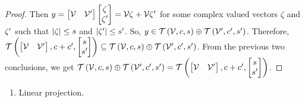 \begin{proof}
Then $y=\begin{bmatrix}\mathcal{V}
&\mathcal{V}^\prime\end{bmatrix}\begin{bmatrix}\zeta\\ \zeta^\prime\end{bmatrix}=\mathcal{V}\zeta+\mathcal{V}\zeta^\prime$
for some complex valued vectors $\zeta$ and $\zeta^\prime$ such that $\left|\zeta\right|\leq s$ and
$\left|\zeta^\prime\right|\leq s^\prime$.  So,
$y\in\mathit{\mathcal{T}}\left(\mathcal{V},c,s\right)\oplus \mathit{\mathcal{T}}\left(\mathcal{V}^\prime,c^\prime,s^\prime\right)$.
Therefore, $\mathit{\mathcal{T}}\left(\begin{bmatrix}\mathcal{V}
& \mathcal{V}^\prime\end{bmatrix},c+c^\prime,\begin{bmatrix}s\\s^\prime\end{bmatrix}\right) \subseteq \mathit{\mathcal{T}}\left(\mathcal{V},c,s\right)\oplus \mathit{\mathcal{T}}\left(\mathcal{V}^\prime,c^\prime,s^\prime\right)$.
From the previous two conclusions, we get
$\mathit{\mathcal{T}}\left(\mathcal{V},c,s\right)\oplus \mathit{\mathcal{T}}\left(\mathcal{V}^\prime,c^\prime,s^\prime\right)
= \mathit{\mathcal{T}}\left(\begin{bmatrix}\mathcal{V}
& \mathcal{V}^\prime\end{bmatrix},c+c^\prime,\begin{bmatrix}s\\s^\prime\end{bmatrix}\right)$.
\end{proof}
%
{\color{red}
\begin{enumerate}
\item Linear projection.
\end{enumerate}
}

